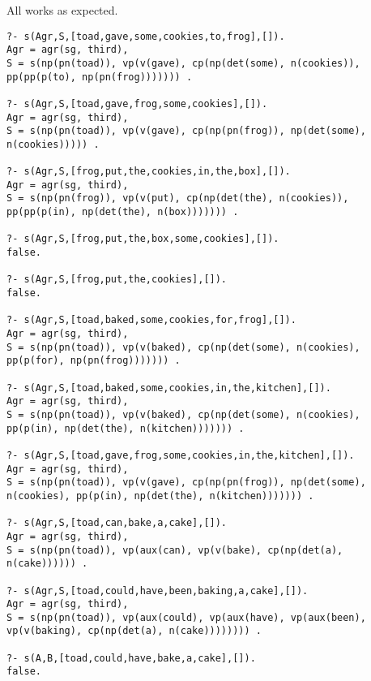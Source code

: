 \documentclass[12pt]{article}
\makeatletter
\newenvironment{problem x}{\@startsection
       {section}
       {1}
       {-.2em}
       {-3.5ex plus -1ex minus -.2ex}
       {2.3ex plus .2ex}
       {\pagebreak[3] %
       \large\bf\noindent{Problem }
       }
       }
       {%
       \begin{center}\large\bf \ldots\ldots\ldots\end{center}}
\makeatother
\begin{document}
  All works as expected.
      \begin{verbatim}
?- s(Agr,S,[toad,gave,some,cookies,to,frog],[]).
Agr = agr(sg, third),
S = s(np(pn(toad)), vp(v(gave), cp(np(det(some), n(cookies)), 
pp(pp(p(to), np(pn(frog))))))) .

?- s(Agr,S,[toad,gave,frog,some,cookies],[]).
Agr = agr(sg, third),
S = s(np(pn(toad)), vp(v(gave), cp(np(pn(frog)), np(det(some), 
n(cookies))))) .

?- s(Agr,S,[frog,put,the,cookies,in,the,box],[]).
Agr = agr(sg, third),
S = s(np(pn(frog)), vp(v(put), cp(np(det(the), n(cookies)), 
pp(pp(p(in), np(det(the), n(box))))))) .

?- s(Agr,S,[frog,put,the,box,some,cookies],[]).
false.

?- s(Agr,S,[frog,put,the,cookies],[]).
false.

?- s(Agr,S,[toad,baked,some,cookies,for,frog],[]).
Agr = agr(sg, third),
S = s(np(pn(toad)), vp(v(baked), cp(np(det(some), n(cookies), 
pp(p(for), np(pn(frog))))))) .

?- s(Agr,S,[toad,baked,some,cookies,in,the,kitchen],[]).
Agr = agr(sg, third),
S = s(np(pn(toad)), vp(v(baked), cp(np(det(some), n(cookies), 
pp(p(in), np(det(the), n(kitchen))))))) .

?- s(Agr,S,[toad,gave,frog,some,cookies,in,the,kitchen],[]).
Agr = agr(sg, third),
S = s(np(pn(toad)), vp(v(gave), cp(np(pn(frog)), np(det(some), 
n(cookies), pp(p(in), np(det(the), n(kitchen))))))) .

?- s(Agr,S,[toad,can,bake,a,cake],[]).
Agr = agr(sg, third),
S = s(np(pn(toad)), vp(aux(can), vp(v(bake), cp(np(det(a), 
n(cake)))))) .

?- s(Agr,S,[toad,could,have,been,baking,a,cake],[]).
Agr = agr(sg, third),
S = s(np(pn(toad)), vp(aux(could), vp(aux(have), vp(aux(been), 
vp(v(baking), cp(np(det(a), n(cake)))))))) .

?- s(A,B,[toad,could,have,bake,a,cake],[]).
false.
      \end{verbatim}
\end{document}
